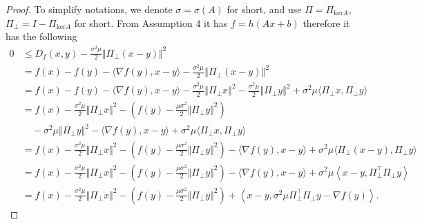 \documentclass[12pt]{article}
\begin{document}
    \begin{proof}   
        To simplify notations, we denote $\sigma = \sigma(A)$ for short, and use $\Pi = \Pi_{\text{ker}A}$, $\Pi_{\perp} = I - \Pi_{\text{ker}A}$ for short. 
        From Assumption 4 it has $f = h(Ax + b)$ therefore it has the following
        {\small
        \begin{align*}
            0 &\le D_f(x, y)  - \frac{\sigma^2 \mu}{2}\Vert \Pi_{\perp}(x - y)\Vert^2
            \\
            &= f(x) - f(y) - \langle \nabla f(y), x - y\rangle 
            - \frac{\sigma^2 \mu}{2}\left\Vert \Pi_{\perp}(x - y)\right\Vert^2
            \\
            &=
            f(x) - f(y) - \langle \nabla f(y), x - y\rangle
            - \frac{\sigma^2 \mu}{2}\left\Vert \Pi_{\perp}x\right\Vert^2
            - \frac{\sigma^2 \mu}{2}\left\Vert \Pi_{\perp}y\right\Vert^2
            + \sigma^2\mu\langle \Pi_{\perp}x, \Pi_{\perp}y\rangle
            \\
            &= 
            f(x) - \frac{\sigma^2 \mu}{2}\Vert \Pi_{\perp} x\Vert^2
            - \left(
                f(y) - \frac{\mu\sigma^2}{2}\Vert \Pi_\perp y\Vert^2 
            \right) 
            \\&\quad 
                - \sigma^2\mu\Vert \Pi_{\perp} y\Vert^2
                - \langle \nabla f(y), x - y\rangle
                + \sigma^2\mu\langle \Pi_\perp x, \Pi_\perp y\rangle
            \\
            &= 
            f(x) - \frac{\sigma^2 \mu}{2}\Vert \Pi_{\perp} x\Vert^2
            - \left(
                f(y) - \frac{\mu\sigma^2}{2}\Vert \Pi_\perp y\Vert^2 
            \right) 
            - \langle \nabla f(y), x - y\rangle
            + \sigma^2\mu\langle \Pi_\perp (x - y), \Pi_\perp y\rangle
            \\
            &= 
            f(x) - \frac{\sigma^2 \mu}{2}\Vert \Pi_{\perp} x\Vert^2
            - \left(
                f(y) - \frac{\mu\sigma^2}{2}\Vert \Pi_\perp y\Vert^2 
            \right) 
            - \langle \nabla f(y), x - y\rangle
            + \sigma^2\mu\left\langle x - y, \Pi_\perp^{\top}\Pi_\perp  y\right\rangle
            \\
            &= 
            f(x) - \frac{\sigma^2 \mu}{2}\Vert \Pi_{\perp} x\Vert^2
            - \left(
                f(y) - \frac{\mu\sigma^2}{2}\Vert \Pi_\perp y\Vert^2 
            \right) 
            + \left\langle x - y, \sigma^2\mu\Pi_\perp^{\top}\Pi_\perp  y - \nabla f(y)\right\rangle. 

\end{align*}}
\end{proof}
\end{document}
